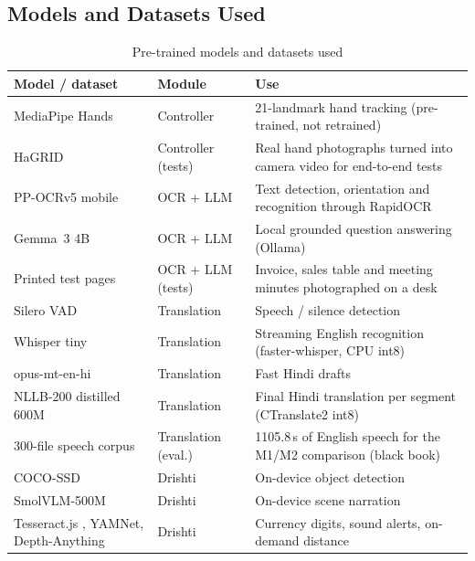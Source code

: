 \documentclass[12pt,singleside,a4paper]{article}
\begin{document}
\subsection{Models and Datasets Used}
\begin{table}[H]
\centering
\caption{Pre-trained models and datasets used}
\label{tab:data}
\small
\begin{tabularx}{\textwidth}{@{}p{3.9cm}p{2.5cm}X@{}}
\toprule
\textbf{Model / dataset} & \textbf{Module} & \textbf{Use} \\
\midrule
MediaPipe Hands \cite{zhang2020mediapipe} & Controller & 21-landmark hand tracking (pre-trained, not retrained) \\
HaGRID \cite{kapitanov2024} & Controller (tests) & Real hand photographs turned into camera video for end-to-end tests \\
PP-OCRv5 mobile \cite{du2020ppocr} & OCR + LLM & Text detection, orientation and recognition through RapidOCR \\
Gemma~3 4B \cite{gemma3} & OCR + LLM & Local grounded question answering (Ollama) \\
Printed test pages & OCR + LLM (tests) & Invoice, sales table and meeting minutes photographed on a desk \\
Silero VAD \cite{silero} & Translation & Speech / silence detection \\
Whisper tiny \cite{radford2023} & Translation & Streaming English recognition (faster-whisper, CPU int8) \\
opus-mt-en-hi \cite{tiedemann2020} & Translation & Fast Hindi drafts \\
NLLB-200 distilled 600M \cite{nllb2022} & Translation & Final Hindi translation per segment (CTranslate2 int8) \\
300-file speech corpus & Translation (eval.) & 1105.8\,s of English speech for the M1/M2 comparison (black book) \\
COCO-SSD \cite{liu2016ssd,sandler2018} & Drishti & On-device object detection \\
SmolVLM-500M \cite{marafioti2025} & Drishti & On-device scene narration \\
Tesseract.js \cite{smith2007}, YAMNet, Depth-Anything & Drishti & Currency digits, sound alerts, on-demand distance \\
\bottomrule
\end{tabularx}
\end{table}
\end{document}

